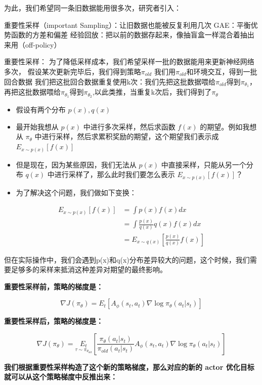 \documentclass[UTF8,fontset=fandol]{ctexart}
\begin{document}
为此，我们希望同一条旧数据能用很多次，研究者引入：

重要性采样（important Sampling）：让旧数据也能被反复利用几次
GAE：平衡优势函数的方差和偏差
经验回放：把以前的数据存起来，像抽盲盒一样混合着抽出来用（off-policy）

重要性采样：
为了降低采样成本，我们希望采样一批的数据能用来更新神经网络多次，
假设某次更新完毕后，我们得到策略\(\pi_{old}\)
我们用\(\pi_{old}\)和环境交互，得到一批回合数据
我们把这批回合数据重复使用k次：我们先把这批数据喂给\(\pi_{old}\)得到\(\pi_{\theta_1}\)，再把这批数据喂给\(\pi_{\theta_1}\)得到\(\pi_{\theta_2}\),以此类推，当重复k次后，我们得到了\(\pi_\theta\)

\begin{itemize}
\item 假设有两个分布 \(p(x), q(x)\)
\item 最开始我想从 \(p(x)\) 中进行多次采样，然后求函数 \(f(x)\) 的期望。例如我想从 \(\pi_\theta\) 中进行采样，然后求累积奖励的期望，这个期望我们表示成 \(E_{x \sim p(x)}[f(x)]\)
\item 但是现在，因为某些原因，我们无法从 \(p(x)\) 中直接采样，只能从另一个分布 \(q(x)\) 中进行采样了，那么此时我们要怎么表示 \(E_{x \sim p(x)}[f(x)]\)？
\item 为了解决这个问题，我们做如下变换：
\end{itemize}



\begin{align*}
E_{x \sim p(x)} [f(x)] &= \int p(x) f(x) dx \\
&= \int \frac{p(x)}{q(x)} q(x) f(x) dx \\
&= E_{x \sim q(x)} \left[ \frac{p(x)}{q(x)} f(x) \right]
\end{align*}


但在实际操作中，我们会遇到p(x)和q(x)分布差异较大的问题，这个时候，我们需要足够多的采样来抵消这种差异对期望的最终影响。

\textbf{重要性采样前，策略的梯度是：}

\[
\nabla J(\pi_\theta) = E_t [A_\phi(s_t, a_t) \nabla \log \pi_\theta(a_t|s_t)]
\]

\textbf{重要性采样后，策略的梯度是：}

\[
\nabla J(\pi_\theta) = \underset{\tau \sim \pi_{\theta_{old}}}{E_t} \left[ \frac{\pi_\theta(a_t|s_t)}{\pi_{old}(a_t|s_t)} A_\phi(s_t, a_t) \nabla \log \pi_\theta(a_t|s_t) \right]
\]

\textbf{我们根据重要性采样构造了这个新的策略梯度，那么对应的新的 actor 优化目标就可以从这个策略梯度中反推出来：}
\end{document}
